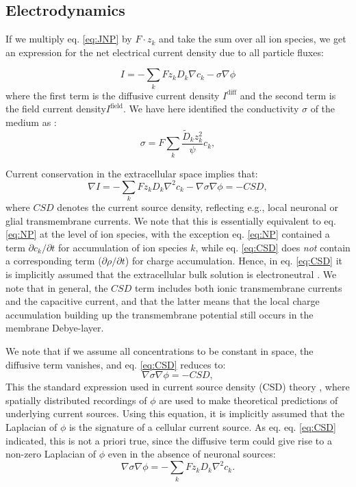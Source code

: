 \documentclass[preprint,11pt,authoryear]{elsarticle}
\begin{document}
\subsection{Electrodynamics}
If we multiply eq. \ref{eq:JNP} by $F\cdot z_k$ and take the sum over all ion species, we get an expression for the net electrical current density due to all particle fluxes:

\begin{equation}
I = - \sum_k{F z_k D_{k}\nabla c_{k}} - \sigma \nabla{\phi}
\label{eq:INP}
\end{equation}
where the first term is the diffusive current density $I^\text{diff}$ and the second term is the field current density$I^\text{field}$. We have here identified the conductivity $\sigma$ of the medium as \cite{Koch1999}:
\begin{equation}
\sigma = F\sum_{k} \frac{\tilde{D}_{k} z_{k}^2}{\psi}c_{k},
\label{eq:sigma}
\end{equation}

Current conservation in the extracellular space implies that:
\begin{equation}
\nabla I = - \sum_k{F z_k D_{k}\nabla^2 c_{k}} - \nabla \sigma \nabla \phi = - CSD,
\label{eq:CSD}
\end{equation}
where $CSD$ denotes the current source density, reflecting e.g., local neuronal or glial transmembrane currents. We note that this is essentially equivalent to eq. \ref{eq:NP} at the level of ion species, with the exception eq. \ref{eq:NP} contained a term $\partial c_k/ \partial t$ for accumulation of ion species $k$, while eq. \ref{eq:CSD} does \emph{not} contain a corresponding term ($\partial \rho/ \partial t$) for charge accumulation. Hence, in eq. \ref{eq:CSD} it is implicitly assumed that the extracellular bulk solution is electroneutral \cite{Solbra2018}. We note that in general, the $CSD$ term includes both ionic transmembrane currents and the capacitive current, and that the latter means that the local charge accumulation building up the transmembrane potential still occurs in the membrane Debye-layer.

We note that if we assume all concentrations to be constant in space, the diffusive term vanishes, and eq. \ref{eq:CSD} reduces to:
\begin{equation}
\nabla \sigma \nabla \phi = - CSD,
\label{eq:CSDstandard}
\end{equation}
This the standard expression used in current source density (CSD) theory \cite{Mitzdorf1985, Nicholson1975, Pettersen2006}, where spatially distributed recordings of $\phi$ are used to make theoretical predictions of underlying current sources. Using this equation, it is implicitly assumed that the Laplacian of $\phi$ is the signature of a cellular current source. As eq. eq. \ref{eq:CSD} indicated, this is not a priori true, since the diffusive term could give rise to a non-zero Laplacian of $\phi$ even in the absence of neuronal sources: 
\begin{equation}
\nabla \sigma \nabla \phi  = - \sum_k{F z_k D_{k}\nabla^2 c_{k}}.
\label{eq:ljpot}
\end{equation}
\end{document}
